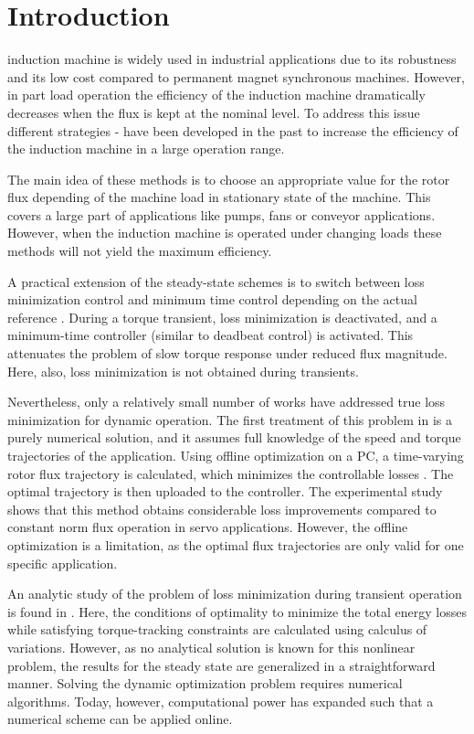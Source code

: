 \documentclass[journal]{IEEEtran}
\begin{document}
\section{Introduction}

 induction machine is widely used in industrial applications due to its robustness and its low cost compared to permanent magnet synchronous machines. However, in part load operation the efficiency of the induction machine dramatically decreases when the flux is kept at the nominal level. To address this issue different strategies \cite{1}-\cite{2} have been developed in the past to increase the efficiency of the induction machine in a large operation range.

The main idea of these methods is to choose an appropriate value for the rotor flux depending of the machine load in stationary state of the machine. This covers a large part of applications like pumps, fans or conveyor applications. However, when the induction machine is operated under changing loads these methods will not yield the maximum efficiency.

A practical extension of the steady-state schemes is to switch
between loss minimization control and minimum time control
depending on the actual reference \cite{3}. During a torque
transient, loss minimization is deactivated, and a minimum-time controller (similar to deadbeat control) is activated. This
attenuates the problem of slow torque response under reduced
flux magnitude. Here, also, loss minimization is not obtained
during transients.

Nevertheless, only a relatively small number of works have
addressed true loss minimization for dynamic operation. The
first treatment of this problem in \cite{4} is a purely numerical solution, and it assumes full knowledge of the speed and
torque trajectories of the application. Using offline optimization on a PC, a time-varying rotor flux trajectory is calculated,
which minimizes the controllable losses \cite{1}. The optimal trajectory is then uploaded to the controller. The experimental study
shows that this method obtains considerable loss improvements
compared to constant norm flux operation in servo applications.
However, the offline optimization is a limitation, as the optimal
flux trajectories are only valid for one specific application.

An analytic study of the problem of loss minimization during transient operation is found in \cite{5}. Here, the conditions
of optimality to minimize the total energy losses while satisfying torque-tracking constraints are calculated using calculus of
variations. However, as no analytical solution is known for this
nonlinear problem, the results for the steady state are generalized in a straightforward manner. Solving the dynamic optimization problem requires numerical algorithms. Today, however, computational power has expanded such that a numerical
scheme can be applied online.
\end{document}
